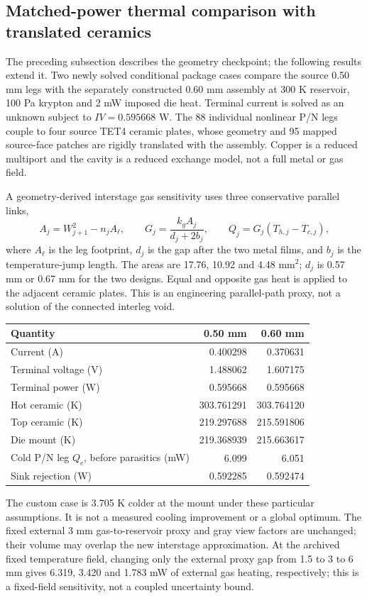 \subsection{Matched-power thermal comparison with translated ceramics}
The preceding subsection describes the geometry checkpoint; the following results extend it. Two newly solved conditional package cases compare the source 0.50 mm legs with the separately constructed 0.60 mm assembly at 300 K reservoir, 100 Pa krypton and 2 mW imposed die heat. Terminal current is solved as an unknown subject to $IV=0.595668$ W. The 88 individual nonlinear P/N legs couple to four source TET4 ceramic plates, whose geometry and 95 mapped source-face patches are rigidly translated with the assembly. Copper is a reduced multiport and the cavity is a reduced exchange model, not a full metal or gas field.

A geometry-derived interstage gas sensitivity uses three conservative parallel links,
\[
 A_j=W_{j+1}^{2}-n_j A_{\ell},\qquad G_j=\frac{k_g A_j}{d_j+2b_j},\qquad Q_j=G_j(T_{h,j}-T_{c,j}),
\]
where $A_{\ell}$ is the leg footprint, $d_j$ is the gap after the two metal films, and $b_j$ is the temperature-jump length. The areas are 17.76, 10.92 and 4.48 mm$^2$; $d_j$ is 0.57 mm or 0.67 mm for the two designs. Equal and opposite gas heat is applied to the adjacent ceramic plates. This is an engineering parallel-path proxy, not a solution of the connected interleg void.

\begin{center}\small\begin{tabular}{lrr}\toprule
Quantity & 0.50 mm & 0.60 mm \\ \midrule
Current (A) & 0.400298 & 0.370631 \\
Terminal voltage (V) & 1.488062 & 1.607175 \\
Terminal power (W) & 0.595668 & 0.595668 \\
Hot ceramic (K) & 303.761291 & 303.764120 \\
Top ceramic (K) & 219.297688 & 215.591806 \\
Die mount (K) & 219.368939 & 215.663617 \\
Cold P/N leg $Q_c$, before parasitics (mW) & 6.099 & 6.051 \\
Sink rejection (W) & 0.592285 & 0.592474 \\
\bottomrule\end{tabular}\end{center}

The custom case is 3.705 K colder at the mount under these particular assumptions. It is not a measured cooling improvement or a global optimum. The fixed external 3 mm gas-to-reservoir proxy and gray view factors are unchanged; their volume may overlap the new interstage approximation. At the archived fixed temperature field, changing only the external proxy gap from 1.5 to 3 to 6 mm gives 6.319, 3.420 and 1.783 mW of external gas heating, respectively; this is a fixed-field sensitivity, not a coupled uncertainty bound.

